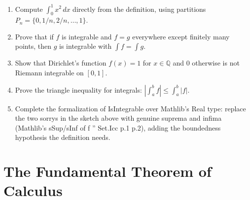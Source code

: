 \documentclass[12pt, openany]{book}
\theoremstyle{plain}
\theoremstyle{definition}
\theoremstyle{remark}
\newcommand{\Q}{\mathbb{Q}}
\newcommand{\li}[1]{{\ttfamily\small\color{tealaccent}#1}}
\begin{document}
\begin{exbox}
\begin{enumerate}
  \item Compute $\int_0^1 x^2\,dx$ directly from the definition, using partitions $P_n = \{0, 1/n, 2/n, \ldots, 1\}$.
  \item Prove that if $f$ is integrable and $f = g$ everywhere except finitely many points, then $g$ is integrable with $\int f = \int g$.
  \item Show that Dirichlet's function $f(x) = 1$ for $x \in \Q$ and $0$ otherwise is not Riemann integrable on $[0,1]$.
  \item Prove the triangle inequality for integrals: $\left|\int_a^b f\right| \leq \int_a^b |f|$.
  \item Complete the formalization of \li{IsIntegrable} over Mathlib's \li{Real} type: replace the two \li{sorry}s in the sketch above with genuine suprema and infima (Mathlib's \li{sSup}/\li{sInf} of \li{f '' Set.Icc p.1 p.2}), adding the boundedness hypothesis the definition needs.
\end{enumerate}
\end{exbox}
\color{black}

\chapter{The Fundamental Theorem of Calculus}
\color{black}
\end{document}
